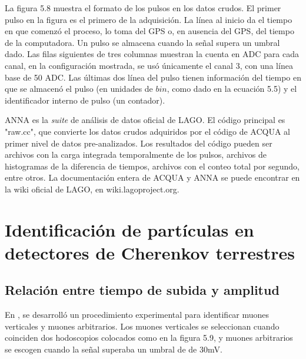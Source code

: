 \documentclass{book}
\begin{document}
La figura 5.8 muestra el formato de los pulsos en los datos crudos. El primer pulso en la figura es el primero de la adquisici\'on. La l\'inea al inicio da el tiempo en que comenz\'o el proceso, lo toma del GPS o, en ausencia del GPS, del tiempo de la computadora. Un pulso se almacena cuando la se\~nal supera un umbral dado. Las filas siguientes de tres columnas muestran la cuenta en ADC para cada canal, en la configuraci\'on mostrada, se us\'o \'unicamente el canal 3, con una l\'inea base de 50 ADC. Las \'ultimas dos l\'inea del pulso tienen informaci\'on del tiempo en que se almacen\'o el pulso (en unidades de $bin$, como dado en la ecuaci\'on 5.5) y el identificador interno de pulso (un contador).

ANNA es la \textit{suite} de an\'alisis de datos oficial de LAGO. El c\'odigo principal es "raw.cc", que convierte los datos crudos adquiridos por el c\'odigo de ACQUA al primer nivel de datos pre-analizados. Los resultados del c\'odigo pueden ser archivos con la carga integrada temporalmente de los pulsos, archivos de histogramas de la diferencia de tiempos, archivos con el conteo total por segundo, entre otros. La documentaci\'on entera de ACQUA y ANNA se puede encontrar en la wiki oficial de LAGO, en wiki.lagoproject.org.

\section{Identificaci\'on de part\'iculas en detectores de Cherenkov terrestres}

\subsection{Relaci\'on entre tiempo de subida y amplitud}

En \citep{Salazar}, se desarroll\'o un procedimiento experimental para identificar muones verticales y muones arbitrarios. Los muones verticales se seleccionan cuando coinciden dos hodoscopios colocados como en la figura 5.9, y muones arbitrarios se escogen cuando la se\~nal superaba un umbral de de 30mV.
\end{document}
